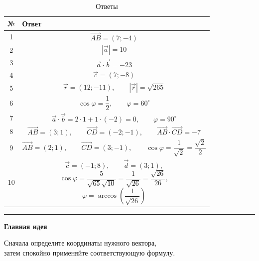 \documentclass[a4paper,12pt]{article}
\newcommand{\vect}[1]{\overrightarrow{#1}}
\newcommand{\dotprod}{\mathbin{\cdot}}
\begin{document}
\begin{table}[ht]
\centering
\caption{Ответы}
\renewcommand{\arraystretch}{1.4}

\begin{tabularx}{\linewidth}{cX}
\toprule
\textbf{№} & \textbf{Ответ} \\
\midrule

1 &
\[
\vect{AB}=(7;-4)
\]
\\

2 &
\[
|\vec a|=10
\]
\\

3 &
\[
\vec a\dotprod\vec b=-23
\]
\\

4 &
\[
\vec c=(7;-8)
\]
\\

5 &
\[
\vec r=(12;-11),
\qquad
|\vec r|=\sqrt{265}
\]
\\

6 &
\[
\cos\varphi=\frac12,
\qquad
\varphi=60^\circ
\]
\\

7 &
\[
\vec a\dotprod\vec b
=
2\cdot1+1\cdot(-2)
=
0,
\qquad
\varphi=90^\circ
\]
\\

8 &
\[
\vect{AB}=(3;1),
\qquad
\vect{CD}=(-2;-1),
\qquad
\vect{AB}\dotprod\vect{CD}=-7
\]
\\

9 &
\[
\vect{AB}=(2;1),
\qquad
\vect{CD}=(3;-1),
\qquad
\cos\varphi=\frac{1}{\sqrt2}
=
\frac{\sqrt2}{2}
\]
\\

10 &
\[
\vec c=(-1;8),
\qquad
\vec d=(3;1),
\]
\[
\cos\varphi
=
\frac{5}{\sqrt{65}\sqrt{10}}
=
\frac{1}{\sqrt{26}}
=
\frac{\sqrt{26}}{26},
\]
\[
\varphi
=
\arccos\!\left(\frac{1}{\sqrt{26}}\right)
\]
\\

\bottomrule
\end{tabularx}

\end{table}

\vfill

\begin{center}
{\color{darkaccent}\rule{0.55\linewidth}{0.6pt}}

\vspace{0.5cm}

\textbf{Главная идея}

Сначала определите координаты нужного вектора,\\
затем спокойно применяйте соответствующую формулу.

\end{center}
\end{document}
